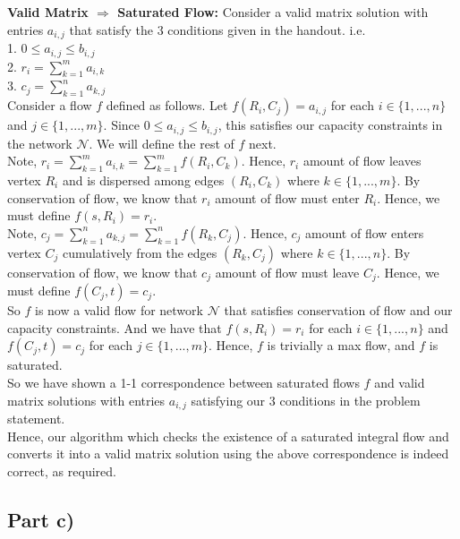 \documentclass[12pt]{article}
\begin{document}
\textbf{Valid Matrix $\Rightarrow$ Saturated Flow:} Consider a valid matrix solution with entries $a_{i,j}$ that satisfy the 3 conditions given in the handout. i.e. \\

1. $0 \leq a_{i,j} \leq b_{i,j}$ \\
2. $r_i = \sum_{k=1}^m a_{i,k}$ \\
3. $c_j = \sum_{k=1}^n a_{k,j}$ \\

Consider a flow $f$ defined as follows. Let $f(R_i, C_j) = a_{i,j}$ for each $i \in \{1,...,n\}$ and $j \in \{1,...,m\}$. Since $0 \leq a_{i,j} \leq b_{i,j}$, this satisfies our capacity constraints in the network $\mathcal{N}$. We will define the rest of $f$ next. \\

Note, $r_i = \sum_{k=1}^m a_{i,k} = \sum_{k=1}^m f(R_i,C_k)$. Hence, $r_i$ amount of flow leaves vertex $R_i$ and is dispersed among edges $(R_i, C_k)$ where $k \in \{1,...,m\}$. By conservation of flow, we know that $r_i$ amount of flow must enter $R_i$. Hence, we must define $f(s, R_i) = r_i$. \\

Note, $c_j = \sum_{k=1}^n a_{k,j} = \sum_{k=1}^n f(R_k, C_j)$. Hence, $c_j$ amount of flow enters vertex $C_j$ cumulatively from the edges $(R_k, C_j)$ where $k \in \{1,...,n\}$. By conservation of flow, we know that $c_j$ amount of flow must leave $C_j$. Hence, we must define $f(C_j, t) = c_j$. \\

So $f$ is now a valid flow for network $\mathcal{N}$ that satisfies conservation of flow and our capacity constraints. And we have that $f(s, R_i) = r_i$ for each $i \in \{1,...,n\}$ and $f(C_j, t) = c_j$ for each $j \in \{1,...,m\}$. Hence, $f$ is trivially a max flow, and $f$ is saturated. \\

So we have shown a 1-1 correspondence between saturated flows $f$ and valid matrix solutions with entries $a_{i,j}$ satisfying our 3 conditions in the problem statement. \\

Hence, our algorithm which checks the existence of a saturated integral flow and converts it into a valid matrix solution using the above correspondence is indeed correct, as required. 

\subsection*{Part c)} 
\end{document}
